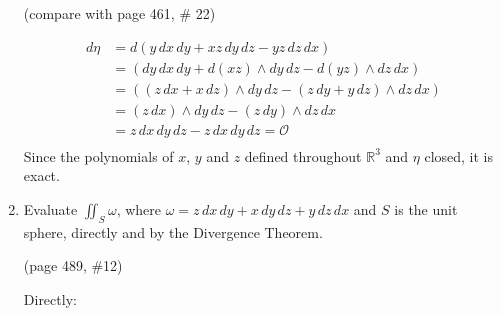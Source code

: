 \documentclass{article}
\begin{document}
\begin{enumerate}
    (compare with page 461, \# 22)

    \begin{align*}
        d\eta &= d (y\, dx \, dy + xz \, dy \, dz - yz \, dz \, dx) \\
        &= (dy \, dx \, dy + d(xz)\wedge  dy \, dz - d(yz) \wedge dz \, dx) \\
        &= ((z \, dx + x \, dz)\wedge  dy \, dz - (z\, dy + y \, dz) \wedge dz \, dx) \\
        &= (z \, dx) \wedge dy \, dz - (z\, dy) \wedge dz \, dx \\
        &= z \, dx \, dy \, dz - z \, dx \, dy \, dz = \mathcal{O}\\
    \end{align*}
    Since the polynomials of $x$, $y$ and $z$ defined throughout $\mathbb{R}^3$ and $\eta$ closed, it is exact.
    \newpage
    \item
    Evaluate $\displaystyle \iint_S \omega$, where $\omega = z\, dx \, dy + x \, dy \, dz + y \, dz \, dx$ and $S$ is the unit sphere, directly and by the Divergence Theorem.

    (page 489, \#12)

    Directly: 
    

\end{enumerate}
\end{document}
